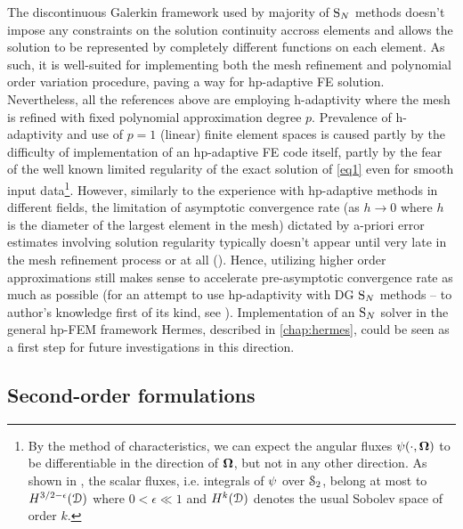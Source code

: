 The discontinuous Galerkin framework used by majority of $\text{S}_{N}$ methods doesn't impose any constraints on the solution
continuity accross elements and allows the solution to be represented by completely different functions on each element.
As such, it is well-suited for implementing both the mesh refinement and polynomial order variation procedure, paving a
way for hp-adaptive FE solution.
Nevertheless, all the references above are employing h-adaptivity where the mesh is refined with fixed polynomial
approximation degree $p$. Prevalence of h-adaptivity and use of $p=1$ (linear) finite element spaces is caused partly
by the difficulty of implementation of an hp-adaptive FE code itself, partly by the fear of the well known limited
regularity of the exact solution of \eqref{eq1} even for smooth input data\footnote{By the method of characteristics, we
can expect the angular fluxes $\psi(\cdot,\mathbf{\Omega})$ to be differentiable in the direction of $\mathbf{\Omega}$, but not in
any other direction. As shown in \cite{Johnson}, the scalar fluxes, i.e. integrals of $\psi$ over $\mathcal{S}_2$, belong
at most to $H^{3/2-\epsilon}(\mathcal{D})$ where $0 < \epsilon \ll 1$ and $H^{k}(\mathcal{D})$ denotes the usual Sobolev space of order
$k$.}.
However, similarly to the experience with hp-adaptive methods in different fields, the limitation of asymptotic
convergence rate (as $h\to 0$ where $h$ is the diameter of the largest element in the mesh) dictated by a-priori error
estimates involving solution regularity typically doesn't appear until very late in the mesh refinement process or at
all (\cite{wang2009convergence}). Hence, utilizing higher order approximations still makes sense to accelerate
pre-asymptotic convergence rate as much as possible (for an attempt to use hp-adaptivity with DG $\text{S}_{N}$ methods -- to
author's knowledge first of its kind, see \cite{FournierDGHP}). Implementation of an $\text{S}_{N}$ solver in the general hp-FEM
framework Hermes, described in \cref{chap:hermes}, could be seen as a first step for future investigations in this
direction.





  

\subsection{Second-order formulations}\label{sec:second-order}


